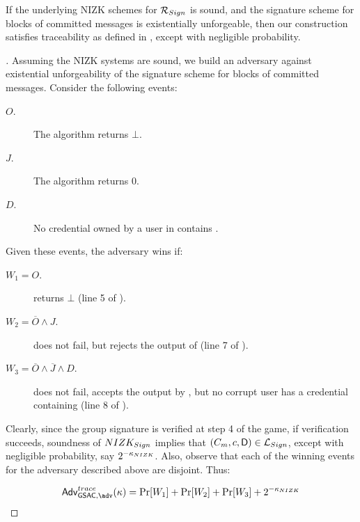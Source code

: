 \begin{theorem}
  \label{thm:trace-gsac}
  If the underlying NIZK schemes for $\mathcal{R}_{Sign}$ %
  is sound, and the signature scheme for blocks of committed messages is
  existentially unforgeable, then our \GSACGen construction satisfies
  traceability as defined in , except with negligible
  probability.
\end{theorem}


\begin{proof}[]
  Assuming the NIZK systems are sound, we build an adversary against existential
  unforgeability of the signature scheme for blocks of committed messages.
  Consider the following events:

  \begin{description}
  \item[$O$.] The \Open algorithm returns $\bot$.
  \item[$J$.] The \Judge algorithm returns $0$.
  \item[$D$.] No credential owned by a user in \CU contains \DAttrs.
  \end{description}

  Given these events, the adversary wins if:

  \begin{description}
  \item[$W_1 = O$.] \Open returns $\bot$ (line 5 of \ExpGSACTrace).
  \item[$W_2 = \overline{O} \land J$.] \Open does not fail, but \Judge rejects
    the output of \Open (line 7 of \ExpGSACTrace).
  \item[$W_3 = \overline{O} \land \overline{J} \land D$.] \Open does not fail,
    \Judge accepts the output by \Open, but no corrupt user has a credential
    containing \DAttrs (line 8 of \ExpGSACTrace).
  \end{description}

  Clearly, since the group signature is verified at step 4 of the game, if
  verification succeeds, soundness of $NIZK_{Sign}$ implies that $(C_m,
  c,\mathsf{D}) \in \mathcal{L}_{Sign}$, except with negligible probability, say
  $2^{-\kappa_{NIZK}}$. Also, observe that each of the winning events for the
  adversary described above are disjoint. Thus:

  \begin{equation}
    \AdvGSACTrace(\secpar) = \Pr[W_1]+\Pr[W_2]+\Pr[W_3]+2^{-\NIZKsecpar}
  \end{equation}


\end{proof}
